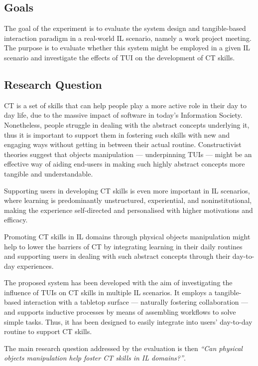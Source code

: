 \subsection{Goals}
The goal of the experiment is to evaluate the system design and tangible-based interaction paradigm in a real-world \ac{IL} scenario, namely a work project meeting. The purpose is to evaluate whether this system might be employed in a given \ac{IL} scenario and investigate the effects of \ac{TUI} on the development of \ac{CT} skills.

\subsection{Research Question}
\ac{CT} is a set of skills that can help people  play a more active role in their day to day life, due to the massive impact of software in today's Information Society. Nonetheless, people struggle in dealing with the abstract concepts underlying it, thus it is important to support them in fostering such skills with new and engaging ways without getting in between their actual routine. Constructivist theories suggest that objects manipulation --- underpinning \acp{TUI} --- might be an effective way of aiding end-users in making such highly abstract concepts more tangible and understandable.

Supporting users in developing \ac{CT} skills is even more important in \ac{IL} scenarios, where learning is predominantly unstructured, experiential, and noninstitutional, making the experience self-directed and personalised with higher motivations and efficacy. 

Promoting \ac{CT} skills in \ac{IL} domains through physical objects manipulation might help to lower the barriers of \ac{CT} by integrating learning in their daily routines and supporting users in dealing with such abstract concepts through their day-to-day experiences.

The proposed system has been developed with the aim of investigating the influence of \acp{TUI} on \ac{CT} skills in multiple \ac{IL} scenarios. It employs a tangible-based interaction with a tabletop surface --- naturally fostering collaboration --- and supports inductive processes by means of assembling workflows to solve simple tasks. Thus, it has been designed to easily integrate into users' day-to-day routine to support \ac{CT} skills.

The main research question addressed by the evaluation is then \textit{``Can physical objects manipulation help foster \ac{CT} skills in \ac{IL} domains?''}.

